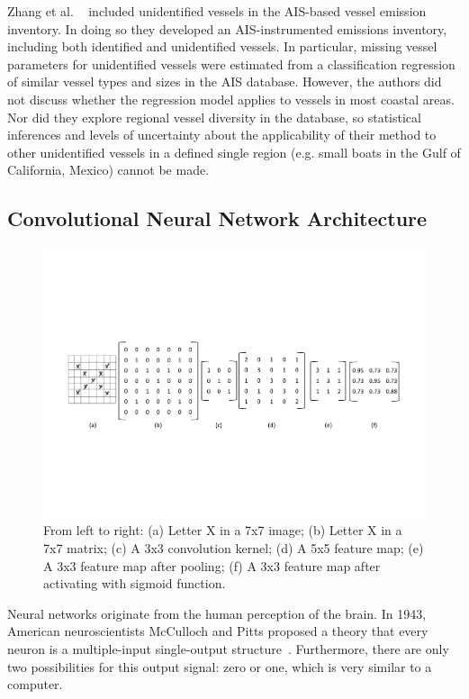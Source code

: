 Zhang et al. ~\cite{Zhang2019TheSO} included unidentified vessels in the AIS-based vessel emission inventory. In doing so they developed an AIS-instrumented emissions inventory, including both identified and unidentified vessels. In particular, missing vessel parameters for unidentified vessels were estimated from a classification regression of similar vessel types and sizes in the AIS database. However, the authors did not discuss whether the regression model applies to vessels in most coastal areas. Nor did they explore regional vessel diversity in the database, so statistical inferences and levels of uncertainty about the applicability of their method to other unidentified vessels in a defined single region (e.g. small boats in the Gulf of California, Mexico) cannot be made.

\subsection{Convolutional Neural Network Architecture}
\begin{figure}[!t]
    \centering
    \includegraphics[width=7in]{img/X.pdf}
    \caption{From left to right: (a) Letter X in a 7x7 image; (b) Letter X in a 7x7 matrix; (c) A 3x3 convolution kernel; (d) A 5x5 feature map; (e) A 3x3 feature map after pooling; (f) A 3x3 feature map after activating with sigmoid function.}
    \label{X}
\end{figure}




Neural networks originate from the human perception of the brain. In 1943, American neuroscientists McCulloch and Pitts proposed a theory that every neuron is a multiple-input single-output structure~\cite{mcculloch1943logical}. Furthermore, there are only two possibilities for this output signal: zero or one, which is very similar to a computer.


